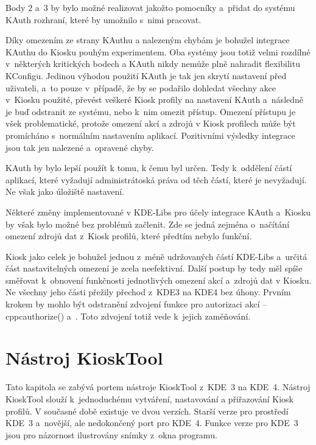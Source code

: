 Body 2 a~3 by bylo možné realizovat jakožto pomocníky a~přidat do systému KAuth rozhraní, které by umožnilo s~nimi pracovat.

Díky omezením ze strany KAuthu a nalezeným chybám je bohužel integrace KAuthu do Kiosku pouhým experimentem. Oba systémy jsou totiž velmi rozdílné v~některých kritických bodech a KAuth nikdy nemůže plně nahradit flexibilitu KConfigu. Jedinou výhodou použití KAuth je tak jen skrytí nastavení před uživateli, a~to pouze v~případě, že by se podařilo dohledat všechny akce v~Kiosku použité, převést veškeré Kiosk profily na nastavení KAuth a~následně je buď odstranit ze systému, nebo k~nim omezit přístup. Omezení přístupu je všek problematické, protože omezení akcí a zdrojů v Kiosk profilech může být promícháno s~normálním nastavením aplikací. Pozitivními výsledky integrace jsou tak jen nalezené a~opravené chyby.

KAuth by bylo lepší použít k tomu, k čemu byl určen. Tedy k~oddělení částí aplikací, které vyžadují administrátoská práva od těch částí, které je nevyžadují. Ne však jako úložiště nastavení.

Některé změny implementované v KDE-Libs pro účely integrace KAuth a~Kiosku by však bylo možné bez problémů začlenit. Zde se jedná zejména o~načítání omezení zdrojů dat z~Kiosk profilů, které předtím nebylo funkční.

Kiosk jako celek je bohužel jednou z~méně udržovaných částí KDE-Libs a~určitá část nastavitelných omezení je zcela neefektivní. Další postup by tedy měl spíše směřovat k~obnovení funkčnosti jednotlivých omezení akcí a~zdrojů dat v Kiosku.  Ne všechny jeho části přežily přechod z~KDE3 na KDE4 bez úhony. Prvním krokem by mohlo být odstranění zdvojení funkce pro autorizaci akcí -- cppc{authorize()} a~. Toto zdvojení totiž vede k~jejich zaměňování.

\chapter{Nástroj KioskTool}
Tato kapitola se zabývá portem nástroje KioskTool z~KDE~3 na KDE~4. Nástroj KioskTool slouží k~jednoduchému vytváření, nastavování a přiřazování Kiosk profilů. V současné době existuje ve dvou verzích. Starší verze pro prostředí KDE~3 a~novější, ale nedokončený port pro KDE~4. Funkce verze pro KDE~3 jsou pro názornost ilustrovány snímky z~okna programu.

